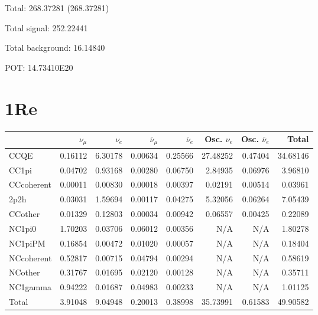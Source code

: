 \documentclass[10pt,a4paper]{article}
\begin{document}
Total: 268.37281    (268.37281)


Total signal: 252.22441


Total background: 16.14840

POT: 14.73410E20


\section*{1Re}
\begin{tabular} { | l ||r | r | r | r | r | r | | r | }
\hline
              & $\nu_\mu$            & $\nu_e$              & $\bar{\nu}_{\mu}$    & $\bar{\nu}_{e}$      & Osc. $\nu_e$         & Osc. $\bar{\nu}_{e}$ & Total                \\ \hline\hline
 CCQE         & 0.16112              & 6.30178              & 0.00634              & 0.25566              & 27.48252             & 0.47404              & 34.68146             \\ \hline
 CC1pi        & 0.04702              & 0.93168              & 0.00280              & 0.06750              & 2.84935              & 0.06976              & 3.96810              \\ \hline
 CCcoherent   & 0.00011              & 0.00830              & 0.00018              & 0.00397              & 0.02191              & 0.00514              & 0.03961              \\ \hline
 2p2h         & 0.03031              & 1.59694              & 0.00117              & 0.04275              & 5.32056              & 0.06264              & 7.05439              \\ \hline
 CCother      & 0.01329              & 0.12803              & 0.00034              & 0.00942              & 0.06557              & 0.00425              & 0.22089              \\ \hline
 NC1pi0       & 1.70203              & 0.03706              & 0.06012              & 0.00356              & N/A                  & N/A                  & 1.80278              \\ \hline
 NC1piPM      & 0.16854              & 0.00472              & 0.01020              & 0.00057              & N/A                  & N/A                  & 0.18404              \\ \hline
 NCcoherent   & 0.52817              & 0.00715              & 0.04794              & 0.00294              & N/A                  & N/A                  & 0.58619              \\ \hline
 NCother      & 0.31767              & 0.01695              & 0.02120              & 0.00128              & N/A                  & N/A                  & 0.35711              \\ \hline
 NC1gamma     & 0.94222              & 0.01687              & 0.04983              & 0.00233              & N/A                  & N/A                  & 1.01125              \\ \hline
\hline
 Total        & 3.91048              & 9.04948              & 0.20013              & 0.38998              & 35.73991             & 0.61583              & 49.90582             \\ \hline

\end{tabular}
\end{document}
